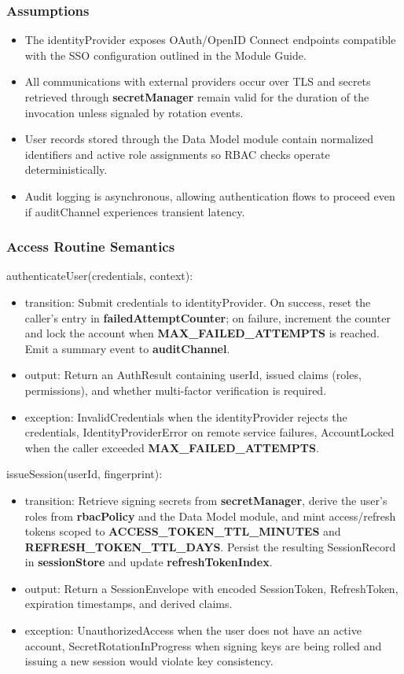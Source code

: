 \documentclass[12pt, titlepage]{article}
\begin{document}
\subsubsection{Assumptions}

\begin{itemize}
  \item The identityProvider exposes OAuth/OpenID Connect endpoints compatible with the SSO configuration outlined in the Module Guide.
  \item All communications with external providers occur over TLS and secrets retrieved through \textbf{secretManager} remain valid for the duration of the invocation unless signaled by rotation events.
  \item User records stored through the Data Model module contain normalized identifiers and active role assignments so RBAC checks operate deterministically.
  \item Audit logging is asynchronous, allowing authentication flows to proceed even if auditChannel experiences transient latency.
\end{itemize}

\subsubsection{Access Routine Semantics}

\noindent authenticateUser(credentials, context):
\begin{itemize}
  \item transition: Submit credentials to identityProvider. On success, reset the caller's entry in \textbf{failedAttemptCounter}; on failure, increment the counter and lock the account when \textbf{MAX\_FAILED\_ATTEMPTS} is reached. Emit a summary event to \textbf{auditChannel}.
  \item output: Return an AuthResult containing userId, issued claims (roles, permissions), and whether multi-factor verification is required.
  \item exception: InvalidCredentials when the identityProvider rejects the credentials, IdentityProviderError on remote service failures, AccountLocked when the caller exceeded \textbf{MAX\_FAILED\_ATTEMPTS}.
\end{itemize}

\noindent issueSession(userId, fingerprint):
\begin{itemize}
  \item transition: Retrieve signing secrets from \textbf{secretManager}, derive the user's roles from \textbf{rbacPolicy} and the Data Model module, and mint access/refresh tokens scoped to \textbf{ACCESS\_TOKEN\_TTL\_MINUTES} and \textbf{REFRESH\_TOKEN\_TTL\_DAYS}. Persist the resulting SessionRecord in \textbf{sessionStore} and update \textbf{refreshTokenIndex}.
  \item output: Return a SessionEnvelope with encoded SessionToken, RefreshToken, expiration timestamps, and derived claims.
  \item exception: UnauthorizedAccess when the user does not have an active account, SecretRotationInProgress when signing keys are being rolled and issuing a new session would violate key consistency.
\end{itemize}
\end{document}

